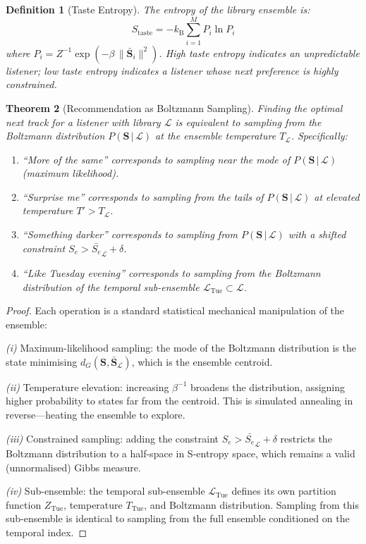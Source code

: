 \documentclass[11pt,twocolumn,a4paper]{article}
\newtheorem{theorem}{Theorem}[section]
\newtheorem{definition}[theorem]{Definition}
\newcommand{\kB}{k_{\mathrm{B}}}
\newcommand{\Se}{S_e}
\newcommand{\Lib}{\mathcal{L}}
\begin{document}
\begin{definition}[Taste Entropy]
\label{def:taste-entropy}
The entropy of the library ensemble is:
\begin{equation}
  S_{\mathrm{taste}} = -\kB \sum_{i=1}^{M} P_i \ln P_i
  \label{eq:taste-entropy}
\end{equation}
where $P_i = Z^{-1} \exp(-\beta\, \|\bar{\mathbf{S}}_i\|^2)$.
High taste entropy indicates an unpredictable listener; low taste
entropy indicates a listener whose next preference is highly
constrained.
\end{definition}

\begin{theorem}[Recommendation as Boltzmann Sampling]
\label{thm:recommendation}
Finding the optimal next track for a listener with library $\Lib$ is
equivalent to sampling from the Boltzmann distribution
$P(\mathbf{S}\,|\,\Lib)$ at the ensemble temperature $T_{\Lib}$.
Specifically:
\begin{enumerate}[label=(\roman*),leftmargin=*]
\item ``More of the same'' corresponds to sampling near the mode of
  $P(\mathbf{S}\,|\,\Lib)$ (maximum likelihood).
\item ``Surprise me'' corresponds to sampling from the tails of
  $P(\mathbf{S}\,|\,\Lib)$ at elevated temperature $T' > T_{\Lib}$.
\item ``Something darker'' corresponds to sampling from
  $P(\mathbf{S}\,|\,\Lib)$ with a shifted constraint
  $\Se > \bar{\Se}_{\Lib} + \delta$.
\item ``Like Tuesday evening'' corresponds to sampling from the
  Boltzmann distribution of the temporal sub-ensemble
  $\Lib_{\mathrm{Tue}} \subset \Lib$.
\end{enumerate}
\end{theorem}

\begin{proof}
Each operation is a standard statistical mechanical manipulation of the
ensemble:

\textit{(i)} Maximum-likelihood sampling: the mode of the Boltzmann
distribution is the state minimising $d_G(\mathbf{S},
\bar{\mathbf{S}}_{\Lib})$, which is the ensemble centroid.

\textit{(ii)} Temperature elevation: increasing $\beta^{-1}$ broadens
the distribution, assigning higher probability to states far from the
centroid. This is simulated annealing in reverse---heating the ensemble
to explore.

\textit{(iii)} Constrained sampling: adding the constraint $\Se >
\bar{\Se}_{\Lib} + \delta$ restricts the Boltzmann distribution to a
half-space in S-entropy space, which remains a valid (unnormalised)
Gibbs measure.

\textit{(iv)} Sub-ensemble: the temporal sub-ensemble
$\Lib_{\mathrm{Tue}}$ defines its own partition function $Z_{\mathrm{Tue}}$,
temperature $T_{\mathrm{Tue}}$, and Boltzmann distribution. Sampling
from this sub-ensemble is identical to sampling from the full ensemble
conditioned on the temporal index.
\end{proof}
\end{document}
